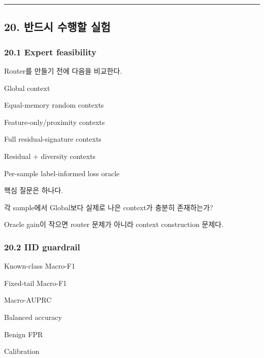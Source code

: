 \medskip\hrule\medskip
\subsection{20. 반드시 수행할 실험}
\subsubsection{20.1 Expert feasibility}
Router를 만들기 전에 다음을 비교한다.

\par\noindent \textbullet\enspace Global context


\par\noindent \textbullet\enspace Equal-memory random contexts


\par\noindent \textbullet\enspace Feature-only/\allowbreak{}proximity contexts


\par\noindent \textbullet\enspace Full residual-signature contexts


\par\noindent \textbullet\enspace Residual +\allowbreak{} diversity contexts


\par\noindent \textbullet\enspace Per-sample label-informed loss oracle


핵심 질문은 하나다.

각 sample에서 Global보다 실제로 나은 context가 충분히 존재하는가?



Oracle gain이 작으면 router 문제가 아니라 context construction 문제다.

\subsubsection{20.2 IID guardrail}
\par\noindent \textbullet\enspace Known-class Macro-F1


\par\noindent \textbullet\enspace Fixed-tail Macro-F1


\par\noindent \textbullet\enspace Macro-AUPRC


\par\noindent \textbullet\enspace Balanced accuracy


\par\noindent \textbullet\enspace Benign FPR


\par\noindent \textbullet\enspace Calibration


